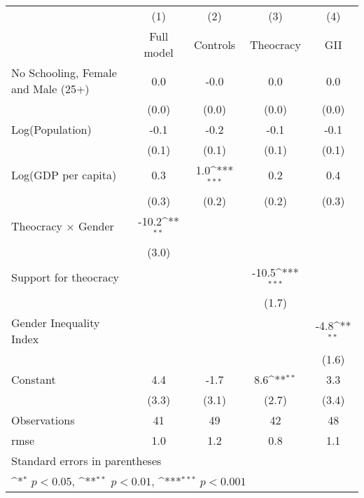 {
\def\sym#1{\ifmmode^{#1}\else\(^{#1}\)\fi}
\begin{tabular}{l*{4}{c}}
\hline\hline
                    &\multicolumn{1}{c}{(1)}&\multicolumn{1}{c}{(2)}&\multicolumn{1}{c}{(3)}&\multicolumn{1}{c}{(4)}\\
                    &\multicolumn{1}{c}{Full model}&\multicolumn{1}{c}{Controls}&\multicolumn{1}{c}{Theocracy}&\multicolumn{1}{c}{GII}\\
\hline
No Schooling, Female and Male (25+)&         0.0         &        -0.0         &         0.0         &         0.0         \\
                    &       (0.0)         &       (0.0)         &       (0.0)         &       (0.0)         \\
[1em]
Log(Population)     &        -0.1         &        -0.2         &        -0.1         &        -0.1         \\
                    &       (0.1)         &       (0.1)         &       (0.1)         &       (0.1)         \\
[1em]
Log(GDP per capita) &         0.3         &         1.0\sym{***}&         0.2         &         0.4         \\
                    &       (0.3)         &       (0.2)         &       (0.2)         &       (0.3)         \\
[1em]
Theocracy $\times$ Gender&       -10.2\sym{**} &                     &                     &                     \\
                    &       (3.0)         &                     &                     &                     \\
[1em]
Support for theocracy&                     &                     &       -10.5\sym{***}&                     \\
                    &                     &                     &       (1.7)         &                     \\
[1em]
Gender Inequality Index&                     &                     &                     &        -4.8\sym{**} \\
                    &                     &                     &                     &       (1.6)         \\
[1em]
Constant            &         4.4         &        -1.7         &         8.6\sym{**} &         3.3         \\
                    &       (3.3)         &       (3.1)         &       (2.7)         &       (3.4)         \\
\hline
Observations        &          41         &          49         &          42         &          48         \\
rmse                &         1.0         &         1.2         &         0.8         &         1.1         \\
\hline\hline
\multicolumn{5}{l}{\footnotesize Standard errors in parentheses}\\
\multicolumn{5}{l}{\footnotesize \sym{*} \(p<0.05\), \sym{**} \(p<0.01\), \sym{***} \(p<0.001\)}\\
\end{tabular}
}

